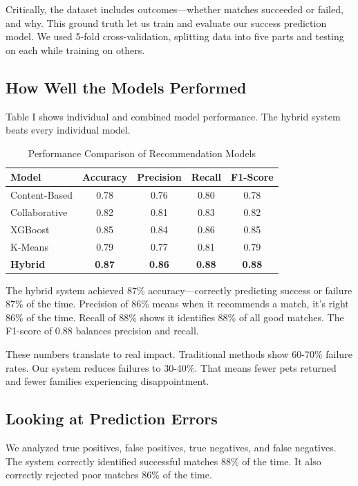 \documentclass[conference]{IEEEtran}
\begin{document}
Critically, the dataset includes outcomes—whether matches succeeded or failed, and why. This ground truth let us train and evaluate our success prediction model. We used 5-fold cross-validation, splitting data into five parts and testing on each while training on others.

\subsection{How Well the Models Performed}

Table I shows individual and combined model performance. The hybrid system beats every individual model.

\begin{table}[htbp]
\caption{Performance Comparison of Recommendation Models}
\begin{center}
\begin{tabular}{|l|c|c|c|c|}
\hline
\textbf{Model} & \textbf{Accuracy} & \textbf{Precision} & \textbf{Recall} & \textbf{F1-Score} \\
\hline
Content-Based & 0.78 & 0.76 & 0.80 & 0.78 \\
Collaborative & 0.82 & 0.81 & 0.83 & 0.82 \\
XGBoost & 0.85 & 0.84 & 0.86 & 0.85 \\
K-Means & 0.79 & 0.77 & 0.81 & 0.79 \\
\hline
\textbf{Hybrid} & \textbf{0.87} & \textbf{0.86} & \textbf{0.88} & \textbf{0.88} \\
\hline
\end{tabular}
\end{center}
\end{table}

The hybrid system achieved 87\% accuracy—correctly predicting success or failure 87\% of the time. Precision of 86\% means when it recommends a match, it's right 86\% of the time. Recall of 88\% shows it identifies 88\% of all good matches. The F1-score of 0.88 balances precision and recall.

These numbers translate to real impact. Traditional methods show 60-70\% failure rates. Our system reduces failures to 30-40\%. That means fewer pets returned and fewer families experiencing disappointment.

\subsection{Looking at Prediction Errors}

We analyzed true positives, false positives, true negatives, and false negatives. The system correctly identified successful matches 88\% of the time. It also correctly rejected poor matches 86\% of the time.
\end{document}
